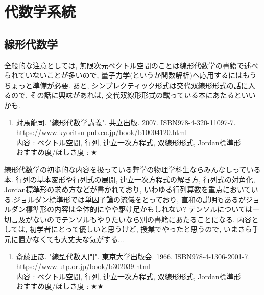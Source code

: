 \documentclass[10pt,a4paper]{jsarticle}
\begin{document}
\section{代数学系統}
\subsection{線形代数学}
    全般的な注意としては, 無限次元ベクトル空間のことは線形代数学の書籍で述べられていないことが多いので, 量子力学(というか関数解析)へ応用するにはもうちょっと準備が必要. あと, シンプレクティック形式は交代双線形形式の話に入るので, その話に興味があれば, 交代双線形形式の載っている本にあたるといいかも. 
    \begin{enumerate}
        \renewcommand{\theenumi}{[LA\arabic{enumi}]}
        \renewcommand{\labelenumi}{\theenumi}
        \setcounter{enumi}{0}
        \item \label{TRLA} 対馬龍司. "線形代数学講義". 共立出版. 2007. ISBN978-4-320-11097-7. \\
        \url{https://www.kyoritsu-pub.co.jp/book/b10004120.html} \\
        内容 : ベクトル空間, 行列, 連立一次方程式, 双線形形式, Jordan標準形\\
        おすすめ度/ほしさ度 : $\bigstar $ 
    \end{enumerate}\par
    線形代数学の初歩的な内容を扱っている弊学の物理学科生ならみんなしっている本. 行列の基本変形や行列式の展開, 連立一次方程式の解き方, 行列式の対角化, Jordan標準形の求め方などが書かれており, いわゆる行列算数を重点においている.ジョルダン標準形では単因子論の流儀をとっており, 直和の説明もあるがジョルダン標準形の内容は全体的にやや駆け足かもしれない? テンソルについては一切言及がないのでテンソルもやりたいなら別の書籍にあたることになる. 内容としては, 初学者にとって優しいと思うけど, 授業でやったと思うので, いまさら手元に置かなくても大丈夫な気がする... 
    \begin{enumerate}
        \renewcommand{\theenumi}{[LA\arabic{enumi}]}
        \renewcommand{\labelenumi}{\theenumi}
        \setcounter{enumi}{1}
        \item \label{SMLA} 斎藤正彦. "線型代数入門". 東京大学出版会. 1966. ISBN978-4-1306-2001-7. \\
        \url{https://www.utp.or.jp/book/b302039.html} \\
        内容 : ベクトル空間, 行列, 連立一次方程式, 双線形形式, Jordan標準形\\
        おすすめ度/ほしさ度 : $\bigstar \bigstar $ 
    \end{enumerate}\par
\end{document}
